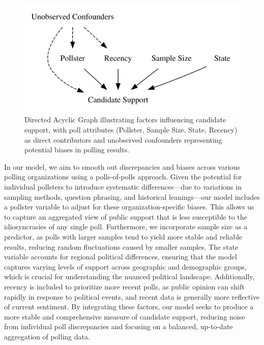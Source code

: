 \documentclass[
  letterpaper,
  DIV=11,
  numbers=noendperiod]{scrartcl}
\begin{document}
\begin{figure}

{\centering \includegraphics{../other/graphs/polls_of_polls_dag.png}

}

\caption{\label{fig-causal-model}Directed Acyclic Graph illustrating
factors influencing candidate support, with poll attributes (Pollster,
Sample Size, State, Recency) as direct contributors and unobserved
confounders representing potential biases in polling results.}

\end{figure}

In our model, we aim to smooth out discrepancies and biases across
various polling organizations using a polls-of-polls approach. Given the
potential for individual pollsters to introduce systematic
differences---due to variations in sampling methods, question phrasing,
and historical leanings---our model includes a pollster variable to
adjust for these organization-specific biases. This allows us to capture
an aggregated view of public support that is less susceptible to the
idiosyncrasies of any single poll. Furthermore, we incorporate sample
size as a predictor, as polls with larger samples tend to yield more
stable and reliable results, reducing random fluctuations caused by
smaller samples. The state variable accounts for regional political
differences, ensuring that the model captures varying levels of support
across geographic and demographic groups, which is crucial for
understanding the nuanced political landscape. Additionally, recency is
included to prioritize more recent polls, as public opinion can shift
rapidly in response to political events, and recent data is generally
more reflective of current sentiment. By integrating these factors, our
model seeks to produce a more stable and comprehensive measure of
candidate support, reducing noise from individual poll discrepancies and
focusing on a balanced, up-to-date aggregation of polling data.
\end{document}
